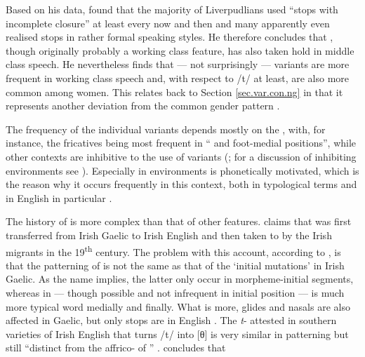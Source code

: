 Based on his \citeyear{knowles1973} data, \citeauthor{knowles1973} found that the majority of Liverpudlians used ``stops with incomplete closure'' at least every now and then and many apparently even realised  stops in rather formal speaking styles.
He therefore concludes that , though originally probably a working class feature, has also taken hold in middle class speech.
He nevertheless finds that --- not surprisingly ---  variants are more frequent in working class speech and, with respect to /t/ at least, are also more common among women.
This relates back to Section \ref{sec.var.con.ng} in that it represents another deviation from the common gender pattern \citeyearpar[cf.][325--327]{knowles1973}.

The frequency of the individual variants depends mostly on the , with, for instance, the fricatives being most frequent in `` and foot-medial positions'', while other contexts are inhibitive to the use of  variants (\citealp[cf.][130]{honeybone2007}; for a discussion of inhibiting environments see \citealt{honeybone2001}).
Especially in  environments  is phonetically motivated, which is the reason why it occurs frequently in this context, both in typological terms and in  English in particular \parencite[cf.][230 and 243]{honeybone2001}.

The history of  is more complex than that of other features.
\textcite{hickey1996} claims that  was first transferred from Irish Gaelic to Irish English and then taken to  by the Irish migrants in the 19\textsuperscript{th} century.
The problem with this account, according to \citet{honeybone2007}, is that the patterning of   is not the same as that of the `initial mutations' in Irish Gaelic.
As the name implies, the latter only occur in morpheme-initial segments, whereas  in  --- though possible and not infrequent in initial position --- is much more typical word medially and finally.
What is more, glides and nasals are also affected in Gaelic, but only stops are  in  English \citep[cf.][131]{honeybone2007}.
The \emph{t}- attested in southern varieties of Irish English that turns /t/ into [θ] is very similar in patterning but still ``distinct from the affrico- of  '' \citep[132]{honeybone2007}.
\citeauthor{honeybone2007} concludes that

